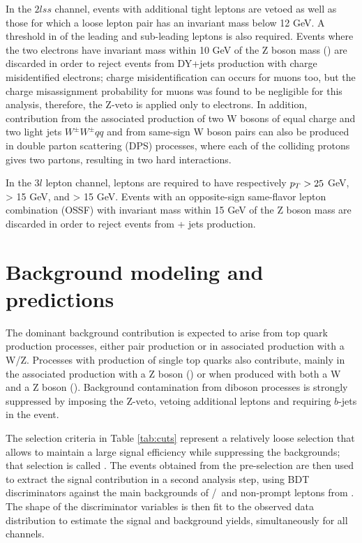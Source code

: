 In the $2lss$ channel, events with additional tight leptons are vetoed as well as those for which a loose lepton pair has an invariant mass below 12 GeV. A threshold in \pt of the leading and sub-leading leptons is also required. Events where the two electrons have invariant mass within 10 GeV of the Z boson mass () are discarded in order to reject events from DY+jets production with charge misidentified electrons; charge misidentification can occurs for muons too, but the charge misassignment probability for muons was found to be negligible \cite{CMS_AN_2014-140} for this analysis, therefore, the Z-veto is applied only to electrons. In addition, contribution from the associated production of two W bosons of equal charge and two light jets $W^\pm W^\pm qq$ and from same-sign W boson pairs can also be produced in double parton scattering (DPS) processes, where each of the colliding protons gives two partons, resulting in two hard interactions.

In the $3l$ lepton channel, leptons are required to have respectively $p_T > 25$ GeV, > 15 GeV, and > 15  GeV. Events with an opposite-sign same-flavor lepton combination (OSSF) with invariant mass within 15 GeV of the Z boson mass are discarded in order to reject events from \WZ + jets production.

\section{Background modeling and predictions}\label{sec:bg}

The dominant background contribution is expected to arise from top quark production processes, either \ttbar pair production or in \ttbar associated production with a W/Z. Processes with production of single top quarks also contribute, mainly in the associated production with a Z boson (\tZq) or when produced with both a W and a Z boson (\tZW). Background contamination from diboson processes is strongly suppressed by imposing the Z-veto, vetoing additional leptons and requiring $b$-jets in the event.

The selection criteria in Table \ref{tab:cuts} represent a relatively loose selection that allows to maintain a large signal efficiency while suppressing the backgrounds; that selection is called . The events obtained from the pre-selection are then used to extract the signal contribution in a second analysis step, using BDT discriminators against the main backgrounds of \ttW/\ttZ\ and non-prompt leptons from \ttbar. The shape of the discriminator variables is then fit to the observed data distribution to estimate the signal and background yields, simultaneously for all channels.

